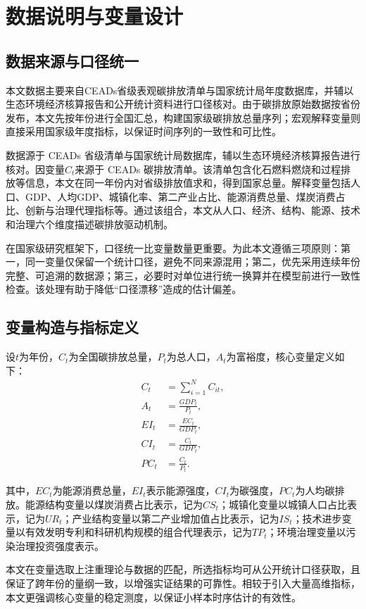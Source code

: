 \section{数据说明与变量设计}
\subsection{数据来源与口径统一}
本文数据主要来自CEADs省级表观碳排放清单与国家统计局年度数据库，并辅以生态环境经济核算报告和公开统计资料进行口径核对。由于碳排放原始数据按省份发布，本文先按年份进行全国汇总，构建国家级碳排放总量序列；宏观解释变量则直接采用国家级年度指标，以保证时间序列的一致性和可比性。

数据源于 CEADs 省级清单与国家统计局数据库，辅以生态环境经济核算报告进行核对。因变量$C_t$来源于 CEADs 碳排放清单。该清单包含化石燃料燃烧和过程排放等信息，本文在同一年份内对省级排放值求和，得到国家总量。解释变量包括人口、GDP、人均GDP、城镇化率、第二产业占比、能源消费总量、煤炭消费占比、创新与治理代理指标等。通过该组合，本文从人口、经济、结构、能源、技术和治理六个维度描述碳排放驱动机制。

在国家级研究框架下，口径统一比变量数量更重要。为此本文遵循三项原则：第一，同一变量仅保留一个统计口径，避免不同来源混用；第二，优先采用连续年份完整、可追溯的数据源；第三，必要时对单位进行统一换算并在模型前进行一致性检查。该处理有助于降低“口径漂移”造成的估计偏差。

\subsection{变量构造与指标定义}
设$t$为年份，$C_t$为全国碳排放总量，$P_t$为总人口，$A_t$为富裕度，核心变量定义如下：
\begin{align}
C_t &= \sum_{i=1}^{N} C_{it}, \\
A_t &= \frac{GDP_t}{P_t}, \\
EI_t &= \frac{EC_t}{GDP_t}, \\
CI_t &= \frac{C_t}{GDP_t}, \\
PC_t &= \frac{C_t}{P_t}.
\end{align}

其中，$EC_t$为能源消费总量，$EI_t$表示能源强度，$CI_t$为碳强度，$PC_t$为人均碳排放。能源结构变量以煤炭消费占比表示，记为$CS_t$；城镇化变量以城镇人口占比表示，记为$UR_t$；产业结构变量以第二产业增加值占比表示，记为$IS_t$；技术进步变量以有效发明专利和科研机构规模的组合代理表示，记为$TP_t$；环境治理变量以污染治理投资强度表示。

本文在变量选取上注重理论与数据的匹配，所选指标均可从公开统计口径获取，且保证了跨年份的量纲一致，以增强实证结果的可靠性。相较于引入大量高维指标，本文更强调核心变量的稳定测度，以保证小样本时序估计的有效性。

